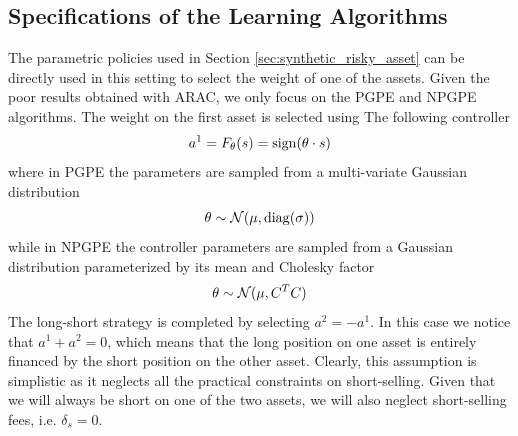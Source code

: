\subsection{Specifications of the Learning Algorithms}
The parametric policies used in Section \ref{sec:synthetic_risky_asset} can be directly used in this setting to select the weight of one of the assets. Given the poor results obtained with ARAC, we only focus on the PGPE and NPGPE algorithms. The weight on the first asset is selected using The following controller 
\begin{equation*}
	a^1 = F_\theta(s) = \operatorname{sign}(\theta \cdot s)
\end{equation*}
where in PGPE the parameters are sampled from a multi-variate Gaussian distribution
\begin{equation*}
	\theta \sim \mathcal{N}(\mu, \operatorname{diag}(\sigma))
\end{equation*}  
while in NPGPE the controller parameters are sampled from a Gaussian distribution parameterized by its mean and Cholesky factor
\begin{equation*}
	\theta \sim \mathcal{N}(\mu, C^T C)
\end{equation*}  
The long-short strategy is completed by selecting $a^2 = - a^1$. In this case we notice that $a^1 + a^2 = 0$, which means that the long position on one asset is entirely financed by the short position on the other asset. Clearly, this assumption is simplistic as it neglects all the practical constraints on short-selling. Given that we will always be short on one of the two assets, we will also neglect short-selling fees, i.e. $\delta_s = 0$. 

